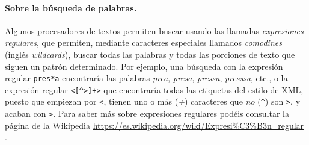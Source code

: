 \paragraph{Sobre la búsqueda de palabras.} Algunos procesadores de textos permiten buscar usando las llamadas \emph{expresiones regulares}, que permiten, mediante caracteres especiales llamados \emph{comodines} (inglés \emph{wildcards}), buscar todas las palabras y todas las porciones de texto que siguen un patrón determinado. Por ejemplo, una búsqueda con la expresión regular \texttt{pres*a} encontraría las palabras \emph{prea}, \emph{presa}, \emph{pressa}, \emph{presssa}, etc., o la expresión regular \texttt{<[\^{}>]+>} que encontraría todas las etiquetas del estilo de XML, puesto que empiezan por \texttt{<}, tienen uno o más (\emph{+}) caracteres que \emph{no} (\texttt{\^}) son \texttt{>}, y acaban con \texttt{>}. Para saber más sobre expresiones regulares podéis consultar la página de la Wikipedia \url{https://es.wikipedia.org/wiki/Expresi%C3%B3n_regular}
.
